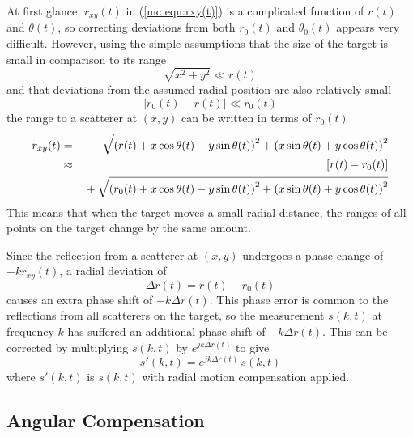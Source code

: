 At first glance, $r_{xy}(t)$ in (\ref{mc eqn:rxy(t)}) is a complicated
function of $r(t)$ and $\theta(t)$, so correcting deviations from both
$r_0(t)$ and $\theta_0(t)$ appears very difficult.  However, using the 
simple assumptions that the size of the target is small in comparison to its 
range
\begin{equation}
\sqrt{x^2+y^2}\ll r(t)
\end{equation}
and that deviations from the assumed radial position are also relatively
small
\begin{equation}
\left|r_0(t)-r(t)\right|\ll r_0(t)
\end{equation}
the range to a scatterer at $(x,y)$ can be written in terms of $r_0(t)$ 
\begin{eqnarray}
r_{xy}(t)
&=&\sqrt{\left(r(t)+x\cos\theta(t)-y\sin\theta(t)\right)^2
+\left(x\sin\theta(t)+y\cos\theta(t)\right)^2}			   {\nonumber}\\
&\approx&\left[r(t)-r_0(t)\right]				   \\
&&\mbox{}+\sqrt{\left(r_0(t)+x\cos\theta(t)-y\sin\theta(t)\right)^2
+\left(x\sin\theta(t)+y\cos\theta(t)\right)^2}			   {\nonumber}
\end{eqnarray}
This means that when the target moves a small radial distance,
the ranges of all points on the target change by the same amount.

Since the reflection from a scatterer at $(x,y)$ undergoes a phase change of
$-kr_{xy}(t)$, a radial deviation of
\begin{equation}
\Delta r(t)=r(t)-r_0(t)
\end{equation}
causes an extra phase shift of $-k\Delta r(t)$.  This phase error is
common to the reflections from all scatterers on the target, so the 
measurement $s(k,t)$ at frequency $k$ has suffered an additional phase shift
of $-k\Delta r(t)$.  This can be corrected by multiplying $s(k,t)$ by
$e^{jk\Delta r(t)}$ to give
\begin{equation}
s'(k,t)=e^{jk\Delta r(t)}\,s(k,t)
\label{mc eqn:rmc}
\end{equation}
where $s'(k,t)$ is $s(k,t)$ with radial motion compensation applied.

\subsection{Angular Compensation}


